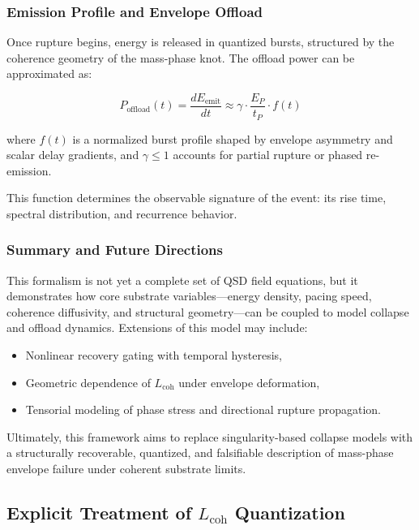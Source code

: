 \documentclass[entropy,article,submit,pdftex,moreauthors]{Definitions/mdpi}
\begin{document}
\subsubsection{Emission Profile and Envelope Offload}

Once rupture begins, energy is released in quantized bursts, structured by the coherence geometry of the mass-phase knot. The offload power can be approximated as:

\begin{equation}
P_{\text{offload}}(t) = \frac{dE_{\text{emit}}}{dt} \approx \gamma \cdot \frac{E_P}{t_P} \cdot f(t)
\end{equation}

where $f(t)$ is a normalized burst profile shaped by envelope asymmetry and scalar delay gradients, and $\gamma \leq 1$ accounts for partial rupture or phased re-emission.

This function determines the observable signature of the event: its rise time, spectral distribution, and recurrence behavior.

\subsubsection{Summary and Future Directions}

This formalism is not yet a complete set of QSD field equations, but it demonstrates how core substrate variables---energy density, pacing speed, coherence diffusivity, and structural geometry---can be coupled to model collapse and offload dynamics. Extensions of this model may include:

\begin{itemize}
  \item Nonlinear recovery gating with temporal hysteresis,
  \item Geometric dependence of $L_{\text{coh}}$ under envelope deformation,
  \item Tensorial modeling of phase stress and directional rupture propagation.
\end{itemize}

Ultimately, this framework aims to replace singularity-based collapse models with a structurally recoverable, quantized, and falsifiable description of mass-phase envelope failure under coherent substrate limits.
\subsection{Explicit Treatment of \texorpdfstring{$L_{\text{coh}}$}{Lcoh} Quantization}
\end{document}
